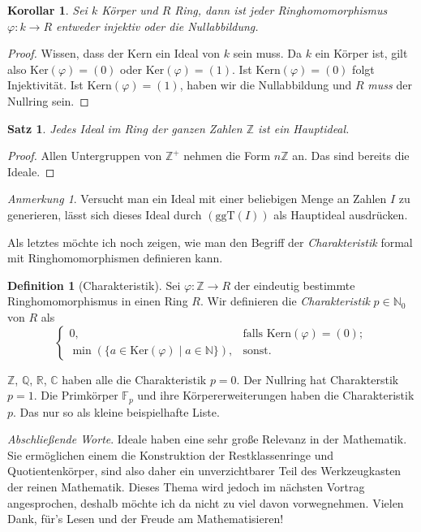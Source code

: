 \documentclass{article}
\newtheorem*{satz}{Satz}
\newtheorem*{cor}{Korollar}
\theoremstyle{definition}
\newtheorem*{definition}{Definition}
\theoremstyle{remark}
\newtheorem*{anm}{Anmerkung}
\begin{document}
\begin{cor}
Sei $k$ Körper und $R$ Ring, dann ist jeder Ringhomomorphismus $\varphi:k\to R$ entweder injektiv oder die
Nullabbildung.
\end{cor}
\begin{proof}
Wissen, dass der Kern ein Ideal von $k$ sein muss. Da $k$ ein Körper ist, gilt also $\mathrm{Ker}(\varphi)=(0)$
oder $\mathrm{Ker}(\varphi)=(1)$. Ist $\mathrm{Kern}(\varphi)=(0)$ folgt Injektivität. Ist
$\mathrm{Kern}(\varphi)=(1)$, haben wir die Nullabbildung und $R$ \emph{muss} der Nullring sein.
\end{proof}

\begin{satz}
Jedes Ideal im Ring der ganzen Zahlen $\mathbb Z$ ist ein Hauptideal.
\end{satz}
\begin{proof}
Allen Untergruppen von $\mathbb Z^+$ nehmen die Form $n\mathbb Z$ an. Das sind bereits die Ideale.
\end{proof}

\begin{anm}
Versucht man ein Ideal mit einer beliebigen Menge an Zahlen $I$ zu generieren, lässt sich dieses Ideal durch
$(\mathrm{ggT}(I))$ als Hauptideal ausdrücken.
\end{anm}

Als letztes möchte ich noch zeigen, wie man den Begriff der \emph{Charakteristik} formal mit Ringhomomorphismen
definieren kann.

\begin{definition}[Charakteristik]
Sei $\varphi: \mathbb Z\to R$ der eindeutig bestimmte Ringhomomorphismus in einen Ring $R$. Wir definieren die
\emph{Charakteristik} $p\in\mathbb N_0$ von $R$ als
\[\begin{cases}
    0, &\text{falls Kern}(\varphi)=(0); \\
    \min\left(\{a\in \mathrm{Ker}(\varphi) \mid a\in\mathbb N\}\right), &\text{sonst.}
\end{cases}\]
\end{definition}
$\mathbb Z$, $\mathbb Q$, $\mathbb R$, $\mathbb C$ haben alle die Charakteristik $p=0$.
Der Nullring hat Charakterstik $p=1$. Die Primkörper $\mathbb F_{p}$ und ihre Körpererweiterungen haben
die Charakteristik $p$. Das nur so als kleine beispielhafte Liste.

\vspace{3em}
\emph{Abschließende Worte}.
Ideale haben eine sehr große Relevanz in der Mathematik. Sie ermöglichen einem die Konstruktion der
Restklassenringe und Quotientenkörper, sind also daher ein unverzichtbarer Teil des
Werkzeugkasten der reinen Mathematik. Dieses Thema wird jedoch im nächsten Vortrag angesprochen, deshalb
möchte ich da nicht zu viel davon vorwegnehmen. Vielen Dank, für's Lesen und der Freude am Mathematisieren!
\end{document}
